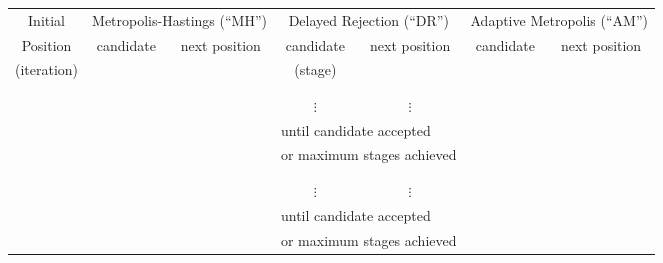 \begin{sidewaystable}[h]
\begin{tabular}{|c||c|c||c|c||c|c|}
\hline
 Initial    & \multicolumn{2}{c||}{Metropolis-Hastings (``MH'')} & \multicolumn{2}{c||}{Delayed Rejection (``DR'')} & \multicolumn{2}{c|}{Adaptive Metropolis (``AM'')} \\
\cline{2-7}
 Position   & candidate     & next position             & candidate     & next position           & candidate     & next position            \\
(iteration) &               &                           & (stage)       &                         &               &                          \\
\hline
\hline
            &               &                           &               &                         &               &                          \\
\cline{4-5}
            &               &                           &               &                         &               &                          \\
\cline{4-5}
            &               &                           & $\vdots$      & $\vdots$                &               &                          \\
\cline{4-5}
            &               &                  & \multicolumn{2}{l||}{until candidate accepted}   &               &                          \\
            &               &                  & \multicolumn{2}{l||}{or maximum stages achieved} &               &                          \\
\hline
\hline
            &               &                           &               &                         &               &                          \\
\cline{4-5}
            &               &                           &               &                         &               &                          \\
\cline{4-5}
            &               &                           & $\vdots$      & $\vdots$                &               &                          \\
\cline{4-5}
            &               &                  & \multicolumn{2}{l||}{until candidate accepted}   &               &                          \\
            &               &                  & \multicolumn{2}{l||}{or maximum stages achieved} &               &                          \\

\end{tabular}
\end{sidewaystable}
